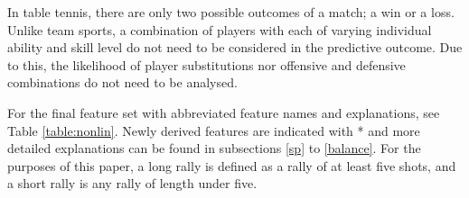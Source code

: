 In table tennis, there are only two possible outcomes of a match; a win or a loss. Unlike team sports, a combination of players with each of varying individual ability and skill level do not need to be considered in the predictive outcome. Due to this, the likelihood of player substitutions nor offensive and defensive combinations do not need to be analysed.

For the final feature set with abbreviated feature names and explanations, see Table \ref{table:nonlin}. Newly derived features are indicated with * and more detailed explanations can be found in subsections \ref{sp} to \ref{balance}. For the purposes of this paper, a long rally is defined as a rally of at least five shots, and a short rally is any rally of length under five.

\begin{table}[ht]
\caption{Feature Summary} %
\centering %
\setlength{\tabcolsep}{3pt}

\label{table:nonlin} %
\end{table}


